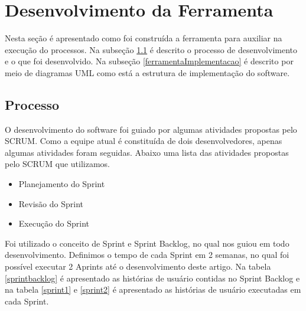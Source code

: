 \section{Desenvolvimento da Ferramenta}\label{ferramentaDeModelagemColabvorativa}
Nesta seção é apresentado como foi construída a ferramenta para auxiliar na execução do processos. Na subseção \ref{ferramentaProcesso} é descrito o processo de desenvolvimento e o que foi desenvolvido. Na subseção \ref{ferramentaImplementacao} é descrito por meio de diagramas UML como está a estrutura de implementação do software.
\subsection{Processo}\label{ferramentaProcesso}
O desenvolvimento do software foi guiado por algumas atividades propostas pelo SCRUM. Como a equipe atual é constituída de dois desenvolvedores, apenas algumas atividades foram seguidas. Abaixo uma lista das atividades propostas pelo SCRUM que utilizamos.
\begin{itemize}
	\item Planejamento do Sprint
	\item Revisão do Sprint
	\item Execução do Sprint
\end{itemize}
Foi utilizado o conceito de Sprint e Sprint Backlog, no qual nos guiou em todo desenvolvimento. Definimos o tempo de cada Sprint em 2 semanas, no qual foi possível executar 2 Aprints até o desenvolvimento deste artigo. Na tabela \ref{sprintbacklog} é apresentado as histórias de usuário contidas no Sprint Backlog e na tabela \ref{sprint1} e \ref{sprint2} é apresentado as histórias de usuário executadas em cada Sprint.

